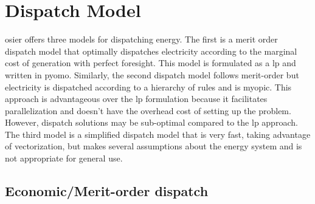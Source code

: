 \section{Dispatch Model}
\ac{osier} offers three models for dispatching energy. The first is a merit order
dispatch model that optimally dispatches electricity according to the marginal
cost of generation with perfect foresight. This model is formulated as a
\acf{lp} and written in \ac{pyomo}. Similarly, the second dispatch model follows
merit-order but electricity is dispatched according to a hierarchy of rules and
is myopic. This approach is advantageous over the \ac{lp} formulation because it
facilitates parallelization and doesn't have the overhead cost of setting up the
problem. However, dispatch solutions may be sub-optimal compared to the \ac{lp}
approach. The third model is a simplified dispatch model that is very fast,
taking advantage of vectorization, but makes several assumptions about the
energy system and is not appropriate for general use.

\subsection{Economic/Merit-order dispatch}
\label{section:merit_order}

